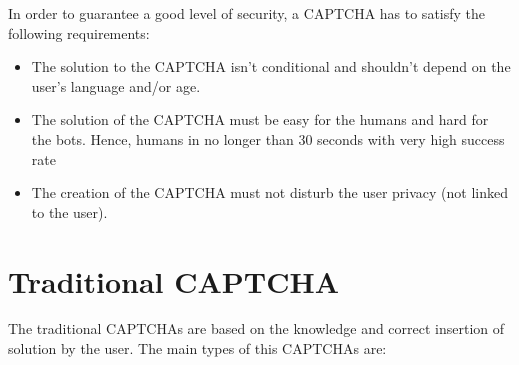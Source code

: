 In order to guarantee a good level of security, a CAPTCHA has to satisfy the following requirements:
\begin{itemize}
\item{The solution to the CAPTCHA isn't conditional and shouldn't depend on the user's language and/or age.}
\item{The solution of the CAPTCHA must be easy for the humans and hard for the bots. Hence, humans in no longer than 30 seconds with very high success rate}
\item{The creation of the CAPTCHA must not disturb the user privacy (not linked to the user).}
\end{itemize}
\vspace{4cm}
\section{Traditional CAPTCHA}
The traditional CAPTCHAs are based on the knowledge and correct insertion of solution by the user. The main types of this CAPTCHAs are: 
